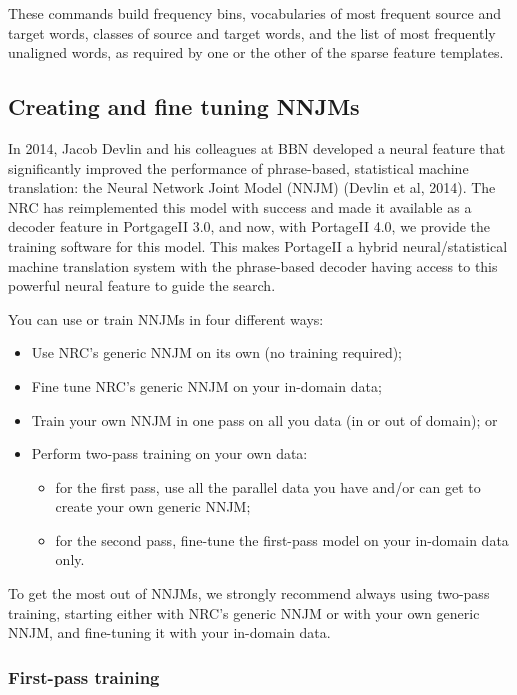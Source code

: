 \documentclass[11pt,letterpaper]{article}
\newcommand{\PS}{PortageII\xspace}
\begin{document}
These commands build frequency bins, vocabularies of most frequent source and
target words, classes of source and target words, and the list of most
frequently unaligned words, as required by one or the other of the sparse
feature templates.

\subsection{Creating and fine tuning NNJMs} \label{NNJM}

In 2014, Jacob Devlin and his colleagues at BBN developed a neural feature that
significantly improved the performance of phrase-based, statistical machine
translation: the Neural Network Joint Model (NNJM) (Devlin et al, 2014).
The NRC has reimplemented this model with success and made it available as a
decoder feature in PortgageII 3.0, and now, with PortageII 4.0, we provide the
training software for this model. This makes \PS a hybrid neural/statistical
machine translation system with the phrase-based decoder having access to this
powerful neural feature to guide the search.

You can use or train NNJMs in four different ways:
\begin{itemize}
   \item Use NRC's generic NNJM on its own (no training required);
   \item Fine tune NRC's generic NNJM on your in-domain data;
   \item Train your own NNJM in one pass on all you data (in or out of domain); or
   \item Perform two-pass training on your own data:
      \begin{itemize}
         \item for the first pass, use all the parallel data you have and/or
            can get to create your own generic NNJM;
         \item for the second pass, fine-tune the first-pass model on your
            in-domain data only.
      \end{itemize}
\end{itemize}

To get the most out of NNJMs, we strongly recommend always using two-pass
training, starting either with NRC's generic NNJM or with your own generic
NNJM, and fine-tuning it with your in-domain data.

\subsubsection{First-pass training}
\end{document}
